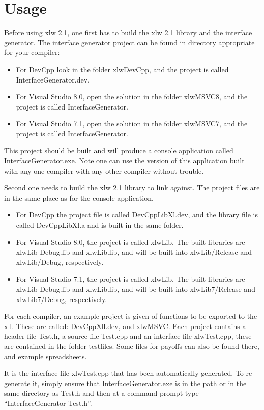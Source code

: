\documentclass[12pt,reqno]{amsart}
\numberwithin{equation}{section}
\numberwithin{figure}{section}
\begin{document}
\section{Usage}

Before using xlw 2.1, one first has to build the xlw 2.1 library and
the interface generator. The interface generator project can be found
in directory appropriate for your compiler:
\begin{itemize}
\item For DevCpp look in the folder xlwDevCpp, and the project is
  called InterfaceGenerator.dev.
\item For Visual Studio 8.0, open the solution in the folder xlwMSVC8, and the
  project is called InterfaceGenerator. 
\item For Visual Studio 7.1, open the solution in the folder xlwMSVC7, and the
  project is called InterfaceGenerator. 
\end{itemize}
This project should be built and will produce a console application
called InterfaceGenerator.exe. Note one can use the version of this
application built with any one compiler with any other compiler
without trouble. 

Second one needs to build the xlw 2.1 library to link against. The
project files are in the same place as for the console application. 
\begin{itemize}
\item For DevCpp the project file is called DevCppLibXl.dev, 
and the
  library file is called  DevCppLibXl.a and is built in the same
  folder. 
\item For Visual Studio 8.0, the project is called xlwLib. The built
  libraries are xlwLib-Debug.lib and xlwLib.lib, and will be built
  into xlwLib/Release and  xlwLib/Debug, respectively. 
\item For Visual Studio 7.1, the project is called xlwLib. The built
  libraries are xlwLib-Debug.lib and xlwLib.lib, and will be built
  into xlwLib7/Release and  xlwLib7/Debug, respectively. 
\end{itemize}

For each compiler, an example project is given of functions to be
exported to the xll. These are called: DevCppXll.dev, and xlwMSVC.
Each project contains a header file Test.h, a source file
Test.cpp and an interface file xlwTest.cpp, these are contained in the
folder testfiles. Some files for payoffs can also be found there, and
example spreadsheets. 

It is the interface file xlwTest.cpp that has been automatically
generated. To re-generate it, simply ensure that
InterfaceGenerator.exe is in the path or in the same directory as
Test.h and then at a command prompt type ``InterfaceGenerator Test.h''. 
\end{document}
